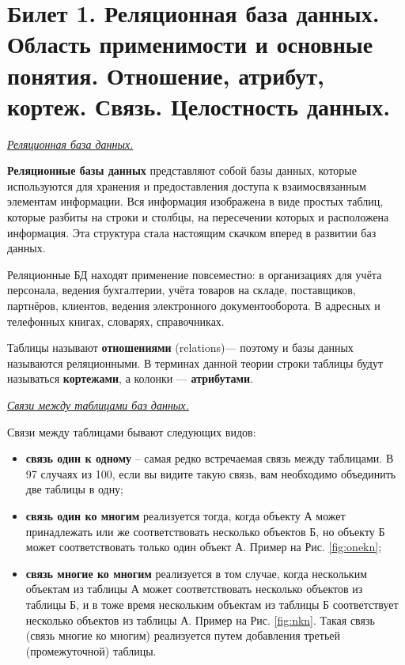 \newpage
\section{Билет 1. Реляционная база данных. Область применимости и основные понятия. Отношение, атрибут, кортеж. Связь. Целостность данных.}

\begin{center}
\textit{\underline{Реляционная база данных.}}
\end{center}

\textbf{Реляционные базы данных} представляют собой базы данных, которые используются для хранения и предоставления доступа к взаимосвязанным элементам информации. Вся информация изображена в виде простых таблиц, которые разбиты на строки и столбцы, на пересечении которых и расположена информация. Эта структура стала настоящим скачком вперед в развитии баз данных.

Реляционные БД находят применение повсеместно: в организациях для учёта персонала, ведения бухгалтерии, учёта товаров на складе, поставщиков, партнёров, клиентов, ведения электронного документооборота. В адресных и телефонных книгах, словарях, справочниках.

Таблицы называют \textbf{отношениями} (relations)— поэтому и базы данных называются реляционными. В терминах данной теории строки таблицы будут называться \textbf{кортежами}, а колонки — \textbf{атрибутами}.

\begin{center}
\textit{\underline{Связи между таблицами баз данных.}}
\end{center}

Связи между таблицами бывают следующих видов: 
\begin{itemize}
    \item \textbf{связь один к одному} – самая редко встречаемая связь между таблицами. В 97 случаях из 100, если вы видите такую связь, вам необходимо объединить две таблицы в одну;
    \item \textbf{связь один ко многим} реализуется тогда, когда объекту А может принадлежать или же соответствовать несколько объектов Б, но объекту Б может соответствовать только один объект А. Пример на Рис. \ref{fig:onekn};
    \item \textbf{связь многие ко многим} реализуется в том случае, когда нескольким объектам из таблицы А может соответствовать несколько объектов из таблицы Б, и в тоже время нескольким объектам из таблицы Б соответствует несколько объектов из таблицы А. Пример на Рис. \ref{fig:nkn}. Такая связь (связь многие ко многим) реализуется путем добавления третьей (промежуточной) таблицы.
\end{itemize}

